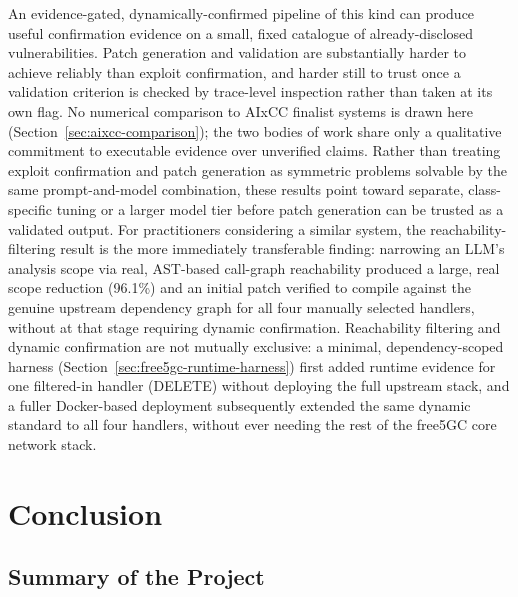 \documentclass[12pt,a4paper]{report}
\begin{document}
An evidence-gated, dynamically-confirmed pipeline of this kind can produce useful confirmation evidence on a small, fixed catalogue of already-disclosed vulnerabilities. Patch generation and validation are substantially harder to achieve reliably than exploit confirmation, and harder still to trust once a validation criterion is checked by trace-level inspection rather than taken at its own flag. No numerical comparison to AIxCC finalist systems is drawn here (Section~\ref{sec:aixcc-comparison}); the two bodies of work share only a qualitative commitment to executable evidence over unverified claims. Rather than treating exploit confirmation and patch generation as symmetric problems solvable by the same prompt-and-model combination, these results point toward separate, class-specific tuning or a larger model tier before patch generation can be trusted as a validated output. For practitioners considering a similar system, the reachability-filtering result is the more immediately transferable finding: narrowing an LLM's analysis scope via real, AST-based call-graph reachability produced a large, real scope reduction (96.1\%) and an initial patch verified to compile against the genuine upstream dependency graph for all four manually selected handlers, without at that stage requiring dynamic confirmation. Reachability filtering and dynamic confirmation are not mutually exclusive: a minimal, dependency-scoped harness (Section~\ref{sec:free5gc-runtime-harness}) first added runtime evidence for one filtered-in handler (DELETE) without deploying the full upstream stack, and a fuller Docker-based deployment subsequently extended the same dynamic standard to all four handlers, without ever needing the rest of the free5GC core network stack.

\chapter{Conclusion}

\section{Summary of the Project}
\end{document}

